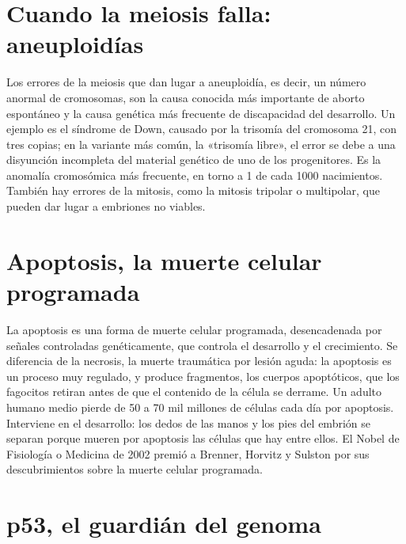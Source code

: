 \documentclass{book}
\begin{document}

\section{Cuando la meiosis falla: aneuploidías}

Los errores de la meiosis que dan lugar a aneuploidía, es decir, un número anormal de cromosomas, son la causa conocida más importante de aborto espontáneo y la causa genética más frecuente de discapacidad del desarrollo. Un ejemplo es el síndrome de Down, causado por la trisomía del cromosoma 21, con tres copias; en la variante más común, la «trisomía libre», el error se debe a una disyunción incompleta del material genético de uno de los progenitores. Es la anomalía cromosómica más frecuente, en torno a 1 de cada 1000 nacimientos. También hay errores de la mitosis, como la mitosis tripolar o multipolar, que pueden dar lugar a embriones no viables.


\section{Apoptosis, la muerte celular programada}

La apoptosis es una forma de muerte celular programada, desencadenada por señales controladas genéticamente, que controla el desarrollo y el crecimiento. Se diferencia de la necrosis, la muerte traumática por lesión aguda: la apoptosis es un proceso muy regulado, y produce fragmentos, los cuerpos apoptóticos, que los fagocitos retiran antes de que el contenido de la célula se derrame. Un adulto humano medio pierde de 50 a 70 mil millones de células cada día por apoptosis. Interviene en el desarrollo: los dedos de las manos y los pies del embrión se separan porque mueren por apoptosis las células que hay entre ellos. El Nobel de Fisiología o Medicina de 2002 premió a Brenner, Horvitz y Sulston por sus descubrimientos sobre la muerte celular programada.


\section{p53, el guardián del genoma}
\end{document}
